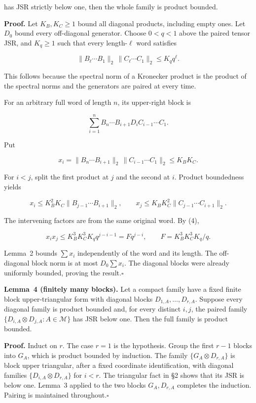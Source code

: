\documentclass[11pt,a4paper]{article}
\begin{document}
has JSR strictly below one, then the whole family is product bounded.

\textbf{Proof.} Let \(K_B,K_C\ge1\) bound all diagonal products, including empty ones. Let \(D_0\) bound every off-diagonal generator. Choose \(0<q<1\) above the paired tensor JSR, and \(K_q\ge1\) such that every length-\(\ell\) word satisfies

\[
\|B_\ell\cdots B_1\|_2\,\|C_\ell\cdots C_1\|_2
\le K_q q^\ell.
\tag{4}
\]

This follows because the spectral norm of a Kronecker product is the product of the spectral norms and the generators are paired at every time.

For an arbitrary full word of length \(n\), its upper-right block is

\[
\sum_{i=1}^n B_n\cdots B_{i+1}D_iC_{i-1}\cdots C_1.
\]

Put

\[
x_i=\|B_n\cdots B_{i+1}\|_2\,
\|C_{i-1}\cdots C_1\|_2\le K_BK_C.
\]

For \(i<j\), split the first product at \(j\) and the second at \(i\). Product boundedness yields

\[
x_i\le K_B^2K_C\|B_{j-1}\cdots B_{i+1}\|_2,
\qquad
x_j\le K_BK_C^2\|C_{j-1}\cdots C_{i+1}\|_2.
\]

The intervening factors are from the same original word. By (4),

\[
x_ix_j\le K_B^3K_C^3K_q q^{j-i-1}
=Fq^{j-i},\qquad F=K_B^3K_C^3K_q/q.
\]

Lemma~2 bounds \(\sum x_i\) independently of the word and its length. The off-diagonal block norm is at most \(D_0\sum x_i\). The diagonal blocks were already uniformly bounded, proving the result.\unskip\nobreak\hfill\(\square\)

\textbf{Lemma~4 (finitely many blocks).} Let a compact family have a fixed finite block upper-triangular form with diagonal blocks \(D_{1,A},\ldots,D_{r,A}\). Suppose every diagonal family is product bounded and, for every distinct \(i,j\), the paired family \(\{D_{i,A}\otimes D_{j,A}:A\in\mathcal M\}\) has JSR below one. Then the full family is product bounded.

\textbf{Proof.} Induct on \(r\). The case \(r=1\) is the hypothesis. Group the first \(r-1\) blocks into \(G_A\), which is product bounded by induction. The family \(\{G_A\otimes D_{r,A}\}\) is block upper triangular, after a fixed coordinate identification, with diagonal families \(\{D_{i,A}\otimes D_{r,A}\}\) for \(i<r\). The triangular fact in \S{}2 shows that its JSR is below one. Lemma~3 applied to the two blocks \(G_A,D_{r,A}\) completes the induction. Pairing is maintained throughout.\unskip\nobreak\hfill\(\square\)
\end{document}
